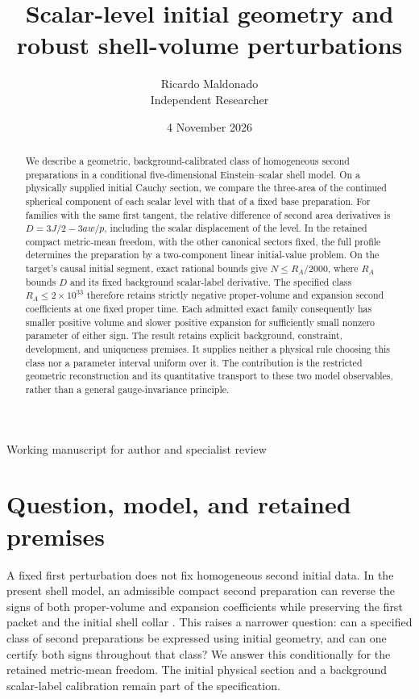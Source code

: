 \documentclass[11pt]{article}
\title{Scalar-level initial geometry and robust shell-volume perturbations}
\author{Ricardo Maldonado\\\small Independent Researcher}
\date{4 November 2026}
\begin{document}
\maketitle
\begin{center}\small Working manuscript for author and specialist review\end{center}
\begin{abstract}
We describe a geometric, background-calibrated class of homogeneous second
preparations in a conditional five-dimensional Einstein--scalar shell model.
On a physically supplied initial Cauchy section, we compare the three-area
of the continued spherical component of each scalar level with that of a
fixed base preparation. For families with the same first tangent, the
relative difference of second area derivatives is
$D=3J/2-3aw/p$, including the scalar displacement of the level.
In the retained compact metric-mean freedom, with the other canonical
sectors fixed, the full profile determines the preparation by a two-component
linear initial-value problem. On the target's causal initial segment,
exact rational bounds give $N\le R_A/2000$, where $R_A$ bounds $D$ and
its fixed background scalar-label derivative. The specified class
$R_A\le2\times10^{33}$ therefore retains strictly negative proper-volume
and expansion second coefficients at one fixed proper time. Each admitted
exact family consequently has smaller positive volume and slower positive
expansion for sufficiently small nonzero parameter of either sign.
The result retains explicit background, constraint, development, and
uniqueness premises. It supplies neither a physical rule choosing this
class nor a parameter interval uniform over it. The contribution is the
restricted geometric reconstruction and its quantitative transport to these
two model observables, rather than a general gauge-invariance principle.
\end{abstract}

\section{Question, model, and retained premises}

A fixed first perturbation does not fix homogeneous second initial data.
In the present shell model, an admissible compact second preparation can
reverse the signs of both proper-volume and expansion coefficients while
preserving the first packet and the initial shell collar
\cite{preparation,records}. This raises a narrower question: can a specified
class of second preparations be expressed using initial geometry, and can
one certify both signs throughout that class? We answer this conditionally
for the retained metric-mean freedom. The initial physical section and a
background scalar-label calibration remain part of the specification.
\end{document}

